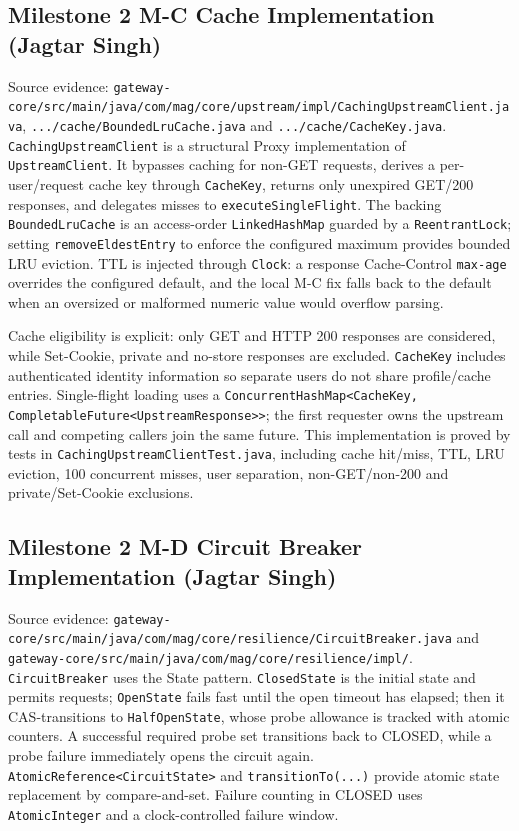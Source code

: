 \documentclass[12pt,a4paper]{article}
\newcommand{\evidence}[1]{\texttt{#1}}
\begin{document}
\subsection{Milestone 2 M-C Cache Implementation (Jagtar Singh)}
Source evidence: \evidence{gateway-core/src/main/java/com/mag/core/upstream/impl/CachingUpstreamClient.java}, \evidence{.../cache/BoundedLruCache.java} and \evidence{.../cache/CacheKey.java}. \texttt{CachingUpstreamClient} is a structural Proxy implementation of \texttt{UpstreamClient}. It bypasses caching for non-GET requests, derives a per-user/request cache key through \texttt{CacheKey}, returns only unexpired GET/200 responses, and delegates misses to \texttt{executeSingleFlight}. The backing \texttt{BoundedLruCache} is an access-order \texttt{LinkedHashMap} guarded by a \texttt{ReentrantLock}; setting \texttt{removeEldestEntry} to enforce the configured maximum provides bounded LRU eviction. TTL is injected through \texttt{Clock}: a response Cache-Control \texttt{max-age} overrides the configured default, and the local M-C fix falls back to the default when an oversized or malformed numeric value would overflow parsing.

Cache eligibility is explicit: only GET and HTTP 200 responses are considered, while Set-Cookie, private and no-store responses are excluded. \texttt{CacheKey} includes authenticated identity information so separate users do not share profile/cache entries. Single-flight loading uses a \texttt{ConcurrentHashMap<CacheKey, CompletableFuture<UpstreamResponse>>}; the first requester owns the upstream call and competing callers join the same future. This implementation is proved by tests in \texttt{CachingUpstreamClientTest.java}, including cache hit/miss, TTL, LRU eviction, 100 concurrent misses, user separation, non-GET/non-200 and private/Set-Cookie exclusions.

\subsection{Milestone 2 M-D Circuit Breaker Implementation (Jagtar Singh)}
Source evidence: \evidence{gateway-core/src/main/java/com/mag/core/resilience/CircuitBreaker.java} and \evidence{gateway-core/src/main/java/com/mag/core/resilience/impl/}. \texttt{CircuitBreaker} uses the State pattern. \texttt{ClosedState} is the initial state and permits requests; \texttt{OpenState} fails fast until the open timeout has elapsed; then it CAS-transitions to \texttt{HalfOpenState}, whose probe allowance is tracked with atomic counters. A successful required probe set transitions back to CLOSED, while a probe failure immediately opens the circuit again. \texttt{AtomicReference<CircuitState>} and \texttt{transitionTo(...)} provide atomic state replacement by compare-and-set. Failure counting in CLOSED uses \texttt{AtomicInteger} and a clock-controlled failure window.
\end{document}
